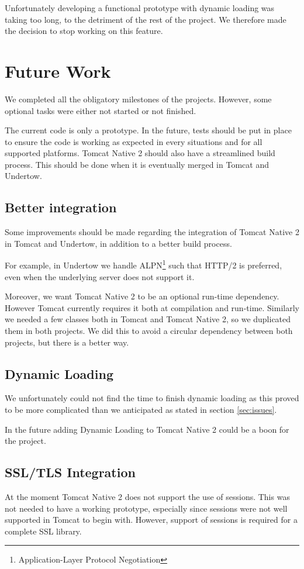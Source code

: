 \documentclass[11pt,a4paper,bibliography=totocnumbered]{scrartcl}
\def\mytitle{Tomcat Native 2}
\begin{document}
 Unfortunately developing a functional prototype with dynamic loading was taking too long, to the detriment of the rest of the project. We therefore made the decision to stop working on this feature.

\section{Future Work}
We completed all the obligatory milestones of the projects. However, some optional tasks were either not started or not finished.

The current code is only a prototype. In the future, tests should be put in place to ensure the code is working as expected in every situations and for all supported platforms. \mytitle{} should also have a streamlined build process. This should be done when it is eventually merged in Tomcat and Undertow.

\subsection{Better integration}
Some improvements should be made regarding the integration of \mytitle{} in Tomcat and Undertow, in addition to a better build process.

For example, in Undertow we handle ALPN\footnote{Application-Layer Protocol Negotiation} such that HTTP/2 is preferred, even when the underlying server does not support it.

Moreover, we want \mytitle{} to be an optional run-time dependency. However Tomcat currently requires it both at compilation and run-time. Similarly we needed a few classes both in Tomcat and \mytitle{}, so we duplicated them in both projects. We did this to avoid a circular dependency between both projects, but there is a better way.

\subsection{Dynamic Loading}
We unfortunately could not find the time to finish dynamic loading as this proved to be more complicated than we anticipated as stated in section \ref{sec:issues}.

In the future adding Dynamic Loading to \mytitle{} could be a boon for the project.

\subsection{SSL/TLS Integration}
At the moment \mytitle{} does not support the use of sessions. This was not needed to have a working prototype, especially since sessions were not well supported in Tomcat to begin with. However, support of sessions is required for a complete SSL library.
\end{document}
